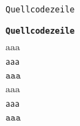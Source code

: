 \documentclass[ngerman,
cdfont=normalbold,
cdfont=heavy,
cdfont=lf,
ttfont=roboto
]{tudscrreprt}
\begin{document}
\begingroup
\let\protect\meaning\mathtt
\endgroup

\ttdefault

%
%
%
%
%
%
%
%

\makeatletter

%

\makeatother

\texttt{Quellcodezeile}

\texttt{\bfseries Quellcodezeile}

$\mathrm{aaa}$

$\mathsf{aaa}$

$\mathtt{aaa}$

\boldmath
$\mathrm{aaa}$

$\mathsf{aaa}$

$\mathtt{aaa}$

\blinddocument



\blindtext\clearpage

\blindmathpaper
\end{document}
